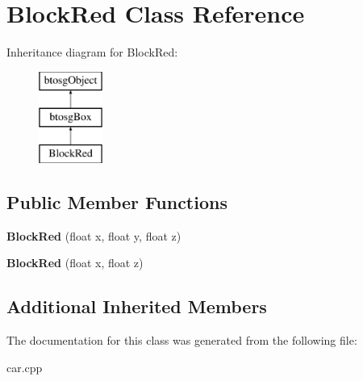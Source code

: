 \hypertarget{classBlockRed}{}\section{Block\+Red Class Reference}
\label{classBlockRed}
Inheritance diagram for Block\+Red\+:\begin{figure}[H]
\begin{center}
\leavevmode
\includegraphics[height=3.000000cm]{classBlockRed}
\end{center}
\end{figure}
\subsection*{Public Member Functions}
\begin{DoxyCompactItemize}
\item 
\mbox{\label{classBlockRed_a56631421f23f2dd67a32fe366b2612f2}} 
{\bfseries Block\+Red} (float x, float y, float z)
\item 
\mbox{\label{classBlockRed_abd643d994ad3cbe6064d7e4703b064d1}} 
{\bfseries Block\+Red} (float x, float z)
\end{DoxyCompactItemize}
\subsection*{Additional Inherited Members}


The documentation for this class was generated from the following file\+:\begin{DoxyCompactItemize}
\item 
car.\+cpp\end{DoxyCompactItemize}
